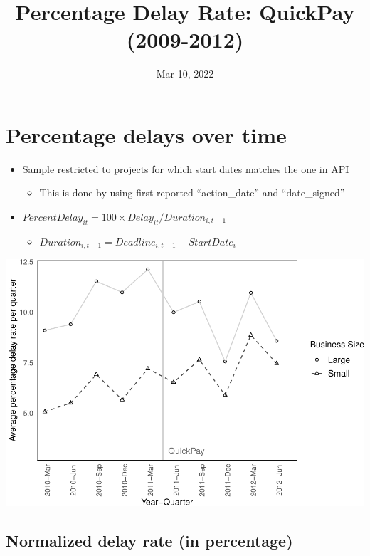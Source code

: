 \documentclass[
]{article}
\title{Percentage Delay Rate: QuickPay (2009-2012)}
\author{}
\date{\vspace{-2.5em}Mar 10, 2022}
\providecommand{\tightlist}{%
  \setlength{\itemsep}{0pt}\setlength{\parskip}{0pt}}
\begin{document}
\maketitle

\hypertarget{percentage-delays-over-time}{%
\section{Percentage delays over
time}\label{percentage-delays-over-time}}

\begin{itemize}
\tightlist
\item
  Sample restricted to projects for which start dates matches the one in
  API

  \begin{itemize}
  \tightlist
  \item
    This is done by using first reported ``action\_date'' and
    ``date\_signed''
  \end{itemize}
\item
  \(PercentDelay_{it}=100 \times Delay_{it}/Duration_{i,t-1}\)

  \begin{itemize}
  \tightlist
  \item
    \(Duration_{i,t-1} = Deadline_{i,t-1} - StartDate_i\)
  \end{itemize}
\end{itemize}

\includegraphics{qp_first_pc_delay-2_files/figure-latex/plot_pc_delay-1.pdf}

\hypertarget{normalized-delay-rate-in-percentage}{%
\subsection{Normalized delay rate (in
percentage)}\label{normalized-delay-rate-in-percentage}}
\end{document}
